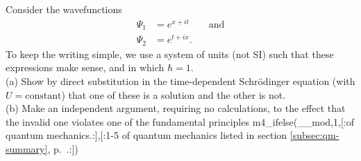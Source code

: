 Consider the wavefunctions
\begin{align*}
  \Psi_1 &= e^{x+it} \qquad \text{and} \\
  \Psi_2 &= e^{t+ix}.
\end{align*}
To keep the writing simple, we use a system of units (not SI) such that these expressions make
sense, and in which $\hbar=1$.\\
(a) Show by direct substitution in the time-dependent Schr\"odinger equation (with $U=\text{constant}$)
that one of these
is a solution and the other is not.\\
(b) Make an independent argument, requiring no calculations, to the effect that the invalid
one violates one of the fundamental principles 
m4_ifelse(__mod,1,[:of quantum mechanics.:],[:1-5 of quantum mechanics listed in section
\ref{subsec:qm-summary}, p.~\pageref{subsec:qm-summary}.:])


